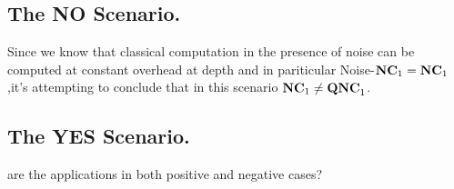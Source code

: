 \documentclass[manuscript,screen,review]{acmart}
\begin{document}
{  \subsection{The NO Scenario.} 

  Since we know that classical computation in the presence of noise can be computed at constant overhead at depth and in pariticular Noise-$\mathbf{NC}_{1} = \mathbf{NC}_{1}$ ,it's attempting to conclude that in this scenario $\mathbf{NC}_{1} \neq \mathbf{QNC}_{1}$. 

  \subsection{The YES Scenario.} 

  are the applications in both positive and negative cases?








}
\end{document}
